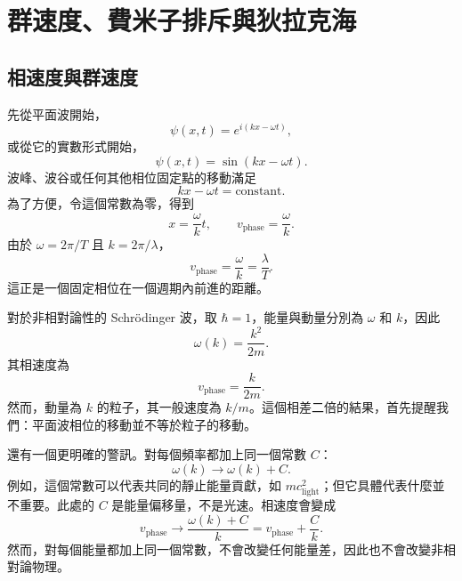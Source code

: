 \chapter{群速度、費米子排斥與狄拉克海}

\section{相速度與群速度}

\begin{classroomqa}
\end{classroomqa}

先從平面波開始，
\begin{equation}
\psi(x,t)=e^{i(kx-\omega t)},
\end{equation}
或從它的實數形式開始，
\begin{equation}
\psi(x,t)=\sin(kx-\omega t).
\end{equation}
波峰、波谷或任何其他相位固定點的移動滿足
\begin{equation}
kx-\omega t=\text{constant}.
\end{equation}
為了方便，令這個常數為零，得到
\begin{equation}
x=\frac{\omega}{k}t,
\qquad
v_{\mathrm{phase}}=\frac{\omega}{k}.
\end{equation}
由於 \(\omega=2\pi/T\) 且 \(k=2\pi/\lambda\)，
\begin{equation}
v_{\mathrm{phase}}=\frac{\omega}{k}=\frac{\lambda}{T}.
\end{equation}
這正是一個固定相位在一個週期內前進的距離。

對於非相對論性的 Schr\"odinger 波，取 \(\hbar=1\)，能量與動量分別為 \(\omega\) 和 \(k\)，因此
\begin{equation}
\omega(k)=\frac{k^2}{2m}.
\end{equation}
其相速度為
\begin{equation}
v_{\mathrm{phase}}=\frac{k}{2m}.
\end{equation}
然而，動量為 \(k\) 的粒子，其一般速度為 \(k/m\)。這個相差二倍的結果，首先提醒我們：平面波相位的移動並不等於粒子的移動。

還有一個更明確的警訊。對每個頻率都加上同一個常數 \(C\)：
\begin{equation}
\omega(k)\longrightarrow \omega(k)+C.
\end{equation}
例如，這個常數可以代表共同的靜止能量貢獻，如 \(mc_{\mathrm{light}}^2\)；但它具體代表什麼並不重要。此處的 \(C\) 是能量偏移量，不是光速。相速度會變成
\begin{equation}
v_{\mathrm{phase}}\longrightarrow
\frac{\omega(k)+C}{k}
=v_{\mathrm{phase}}+\frac{C}{k}.
\end{equation}
然而，對每個能量都加上同一個常數，不會改變任何能量差，因此也不會改變非相對論物理。

